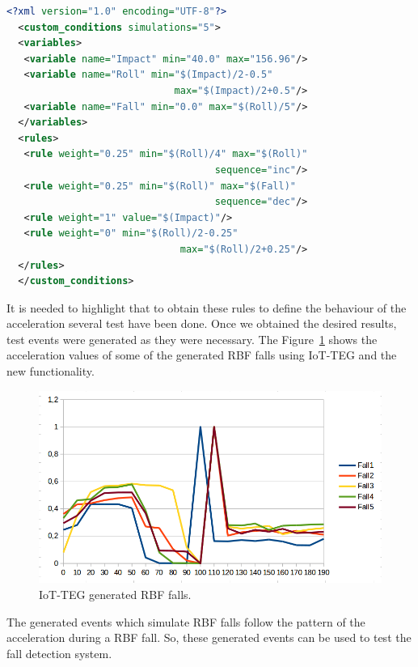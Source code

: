 \documentclass[conference]{IEEEtran}
\theoremstyle{definition}
\begin{document}
\begin{lstlisting}[basicstyle=\ttfamily\footnotesize,language=XML,caption={Rules to define a RBF fall},label=RBFFallRules]
  <?xml version="1.0" encoding="UTF-8"?>
  <custom_conditions simulations="5">
  <variables>
   <variable name="Impact" min="40.0" max="156.96"/>
   <variable name="Roll" min="$(Impact)/2-0.5" 
                             max="$(Impact)/2+0.5"/>
   <variable name="Fall" min="0.0" max="$(Roll)/5"/>
  </variables>
  <rules>
   <rule weight="0.25" min="$(Roll)/4" max="$(Roll)" 
                                    sequence="inc"/>
   <rule weight="0.25" min="$(Roll)" max="$(Fall)" 
                                    sequence="dec"/>
   <rule weight="1" value="$(Impact)"/>
   <rule weight="0" min="$(Roll)/2-0.25" 
                              max="$(Roll)/2+0.25"/>
  </rules>
  </custom_conditions>
\end{lstlisting}

It is needed to highlight that to obtain these rules to define the behaviour of the acceleration several test
have been done. Once we obtained the desired results, test events were generated as they were necessary. The 
Figure~\ref{fig:IoTTEGRBFGeneratedEvents} shows the acceleration values of some of the generated RBF falls using
IoT-TEG and the new functionality.

\begin{figure}[!h]
  \centering
  \includegraphics[scale=0.3]{img/IoTTEGRBFGeneratedEvents}
  \caption[IoT-TEG generated RBF falls]{IoT-TEG generated RBF falls.}
  \label{fig:IoTTEGRBFGeneratedEvents}
\end{figure}

The generated events which simulate RBF falls follow the pattern of the acceleration during a RBF fall.
So, these generated events can be used to test the fall detection system.
\end{document}
